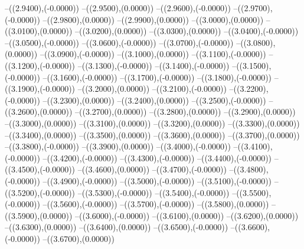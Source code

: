 {	--({\sx*(2.9400)},{\sy*(-0.0000)})
	--({\sx*(2.9500)},{\sy*(0.0000)})
	--({\sx*(2.9600)},{\sy*(-0.0000)})
	--({\sx*(2.9700)},{\sy*(-0.0000)})
	--({\sx*(2.9800)},{\sy*(0.0000)})
	--({\sx*(2.9900)},{\sy*(0.0000)})
	--({\sx*(3.0000)},{\sy*(0.0000)})
	--({\sx*(3.0100)},{\sy*(0.0000)})
	--({\sx*(3.0200)},{\sy*(0.0000)})
	--({\sx*(3.0300)},{\sy*(0.0000)})
	--({\sx*(3.0400)},{\sy*(-0.0000)})
	--({\sx*(3.0500)},{\sy*(-0.0000)})
	--({\sx*(3.0600)},{\sy*(-0.0000)})
	--({\sx*(3.0700)},{\sy*(-0.0000)})
	--({\sx*(3.0800)},{\sy*(0.0000)})
	--({\sx*(3.0900)},{\sy*(-0.0000)})
	--({\sx*(3.1000)},{\sy*(0.0000)})
	--({\sx*(3.1100)},{\sy*(-0.0000)})
	--({\sx*(3.1200)},{\sy*(-0.0000)})
	--({\sx*(3.1300)},{\sy*(-0.0000)})
	--({\sx*(3.1400)},{\sy*(-0.0000)})
	--({\sx*(3.1500)},{\sy*(-0.0000)})
	--({\sx*(3.1600)},{\sy*(-0.0000)})
	--({\sx*(3.1700)},{\sy*(-0.0000)})
	--({\sx*(3.1800)},{\sy*(-0.0000)})
	--({\sx*(3.1900)},{\sy*(-0.0000)})
	--({\sx*(3.2000)},{\sy*(0.0000)})
	--({\sx*(3.2100)},{\sy*(-0.0000)})
	--({\sx*(3.2200)},{\sy*(-0.0000)})
	--({\sx*(3.2300)},{\sy*(0.0000)})
	--({\sx*(3.2400)},{\sy*(0.0000)})
	--({\sx*(3.2500)},{\sy*(-0.0000)})
	--({\sx*(3.2600)},{\sy*(0.0000)})
	--({\sx*(3.2700)},{\sy*(0.0000)})
	--({\sx*(3.2800)},{\sy*(0.0000)})
	--({\sx*(3.2900)},{\sy*(0.0000)})
	--({\sx*(3.3000)},{\sy*(0.0000)})
	--({\sx*(3.3100)},{\sy*(0.0000)})
	--({\sx*(3.3200)},{\sy*(0.0000)})
	--({\sx*(3.3300)},{\sy*(0.0000)})
	--({\sx*(3.3400)},{\sy*(0.0000)})
	--({\sx*(3.3500)},{\sy*(0.0000)})
	--({\sx*(3.3600)},{\sy*(0.0000)})
	--({\sx*(3.3700)},{\sy*(0.0000)})
	--({\sx*(3.3800)},{\sy*(-0.0000)})
	--({\sx*(3.3900)},{\sy*(0.0000)})
	--({\sx*(3.4000)},{\sy*(-0.0000)})
	--({\sx*(3.4100)},{\sy*(-0.0000)})
	--({\sx*(3.4200)},{\sy*(-0.0000)})
	--({\sx*(3.4300)},{\sy*(-0.0000)})
	--({\sx*(3.4400)},{\sy*(-0.0000)})
	--({\sx*(3.4500)},{\sy*(-0.0000)})
	--({\sx*(3.4600)},{\sy*(0.0000)})
	--({\sx*(3.4700)},{\sy*(-0.0000)})
	--({\sx*(3.4800)},{\sy*(-0.0000)})
	--({\sx*(3.4900)},{\sy*(-0.0000)})
	--({\sx*(3.5000)},{\sy*(-0.0000)})
	--({\sx*(3.5100)},{\sy*(-0.0000)})
	--({\sx*(3.5200)},{\sy*(-0.0000)})
	--({\sx*(3.5300)},{\sy*(-0.0000)})
	--({\sx*(3.5400)},{\sy*(-0.0000)})
	--({\sx*(3.5500)},{\sy*(-0.0000)})
	--({\sx*(3.5600)},{\sy*(-0.0000)})
	--({\sx*(3.5700)},{\sy*(-0.0000)})
	--({\sx*(3.5800)},{\sy*(0.0000)})
	--({\sx*(3.5900)},{\sy*(0.0000)})
	--({\sx*(3.6000)},{\sy*(-0.0000)})
	--({\sx*(3.6100)},{\sy*(0.0000)})
	--({\sx*(3.6200)},{\sy*(0.0000)})
	--({\sx*(3.6300)},{\sy*(0.0000)})
	--({\sx*(3.6400)},{\sy*(0.0000)})
	--({\sx*(3.6500)},{\sy*(-0.0000)})
	--({\sx*(3.6600)},{\sy*(-0.0000)})
	--({\sx*(3.6700)},{\sy*(0.0000)})
}
